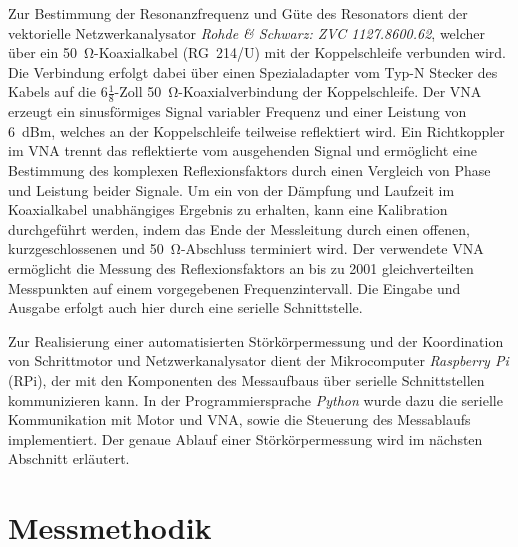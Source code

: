 Zur Bestimmung der Resonanzfrequenz und Güte des Resonators dient der vektorielle Netzwerkanalysator \textit{Rohde \& Schwarz: ZVC 1127.8600.62}, welcher über ein \SI{50}{\ohm}-Koaxialkabel (RG~214/U) mit der Koppelschleife verbunden wird.
Die Verbindung erfolgt dabei über einen Spezialadapter vom Typ-N Stecker des Kabels auf die $6\tfrac{1}{8}$-Zoll \SI{50}{\ohm}-Koaxialverbindung der Koppelschleife.
Der VNA erzeugt ein sinusförmiges Signal variabler Frequenz und einer Leistung von \SI{6}{dBm}, welches an der Koppelschleife teilweise reflektiert wird.
Ein Richtkoppler im VNA trennt das reflektierte vom ausgehenden Signal und ermöglicht eine Bestimmung des komplexen Reflexionsfaktors durch einen Vergleich von Phase und Leistung beider Signale.
Um ein von der Dämpfung und Laufzeit im Koaxialkabel unabhängiges Ergebnis zu erhalten, kann eine Kalibration durchgeführt werden, indem das Ende der Messleitung durch einen offenen, kurzgeschlossenen und \SI{50}{\ohm}-Abschluss terminiert wird.
Der verwendete VNA ermöglicht die Messung des Reflexionsfaktors an bis zu \num{2001} gleichverteilten Messpunkten auf einem vorgegebenen Frequenzintervall.
Die Eingabe und Ausgabe erfolgt auch hier durch eine serielle Schnittstelle.

Zur Realisierung einer automatisierten Störkörpermessung und der Koordination von Schrittmotor und Netzwerkanalysator dient der Mikrocomputer \textit{Raspberry Pi} (RPi), der mit den Komponenten des Messaufbaus über serielle Schnittstellen kommunizieren kann.
In der Programmiersprache \textit{Python} wurde dazu die serielle Kommunikation mit Motor und VNA, sowie die Steuerung des Messablaufs implementiert.
Der genaue Ablauf einer Störkörpermessung wird im nächsten Abschnitt erläutert.


\section{Messmethodik}

